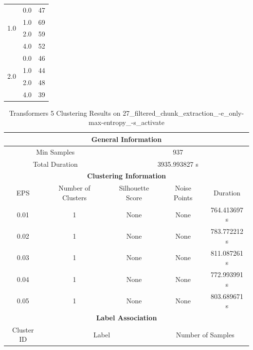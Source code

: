 \begin{longtable}{|c|c|c|c|c|}
\hline
\multirow{4}{*}{1.0} & \multicolumn{2}{c|}{0.0} & \multicolumn{2}{c|}{47} \\
& \multicolumn{2}{c|}{1.0} & \multicolumn{2}{c|}{69} \\
& \multicolumn{2}{c|}{2.0} & \multicolumn{2}{c|}{59} \\
& \multicolumn{2}{c|}{4.0} & \multicolumn{2}{c|}{52} \\
\hline
\multirow{4}{*}{2.0} & \multicolumn{2}{c|}{0.0} & \multicolumn{2}{c|}{46} \\
& \multicolumn{2}{c|}{1.0} & \multicolumn{2}{c|}{44} \\
& \multicolumn{2}{c|}{2.0} & \multicolumn{2}{c|}{48} \\
& \multicolumn{2}{c|}{4.0} & \multicolumn{2}{c|}{39} \\
\hline
\end{longtable}


\begin{longtable}{|c|c|c|c|c|}
\caption{Transformers 5 Clustering Results on 27\_filtered\_chunk\_extraction\_-e\_only-max-entropy\_-s\_activate} \label{tab:27_filtered_chunk_extraction_-e_only-max-entropy_-s_activate_transformers_5_clustering_results}\\
\hline
\multicolumn{5}{|c|}{\textbf{General Information}} \\
\hline
\multicolumn{2}{|c|}{Min Samples} & \multicolumn{3}{c|}{937} \\
\multicolumn{2}{|c|}{Total Duration} & \multicolumn{3}{c|}{3935.993827 s} \\
\hline
\multicolumn{5}{|c|}{\textbf{Clustering Information}} \\
\hline
EPS & Number of Clusters & Silhouette Score & Noise Points & Duration \\
0.01 & 1 & None & None & 764.413697 s\\
0.02 & 1 & None & None & 783.772212 s\\
0.03 & 1 & None & None & 811.087261 s\\
0.04 & 1 & None & None & 772.993991 s\\
0.05 & 1 & None & None & 803.689671 s\\
\hline
\multicolumn{5}{|c|}{\textbf{Label Association}} \\
\hline
Cluster ID & \multicolumn{2}{c|}{Label} & \multicolumn{2}{c|}{Number of Samples} \\
\hline
\end{longtable}


